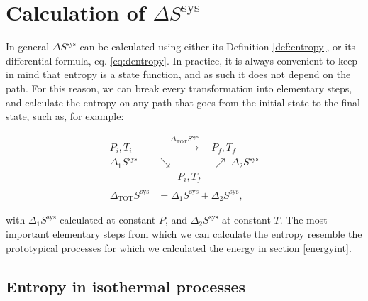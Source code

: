 \documentclass[
  9pt,
]{extbook}
\theoremstyle{definition}
\theoremstyle{definition}
\theoremstyle{definition}
\theoremstyle{definition}
\theoremstyle{remark}
\begin{document}
\section{\texorpdfstring{Calculation of \(\Delta S^{\mathrm{sys}}\)}{Calculation of \textbackslash Delta S\^{}\{\textbackslash mathrm\{sys\}\}}}\label{dssys}

In general \(\Delta S^{\mathrm{sys}}\) can be calculated using either its Definition \ref{def:entropy}, or its differential formula, eq. \eqref{eq:dentropy}. In practice, it is always convenient to keep in mind that entropy is a state function, and as such it does not depend on the path. For this reason, we can break every transformation into elementary steps, and calculate the entropy on any path that goes from the initial state to the final state, such as, for example:

\begin{equation}
\begin{aligned}
P_i, T_i & \quad \xrightarrow{ \Delta_{\text{TOT}} S^{\text{sys}} } \quad P_f, T_f \\
  \scriptstyle{\Delta_1 S^{\text{sys}}} & \searrow \qquad  \qquad \nearrow \; \scriptstyle{\Delta_2 S^{\text{sys}}} \\
& \qquad P_i, T_f \\
\\
\Delta_{\text{TOT}} S^{\text{sys}} & = \Delta_1 S^{\text{sys}} + \Delta_2 S^{\text{sys}},
\end{aligned}
\label{eq:entropycycle}
\end{equation}

with \(\Delta_1 S^{\text{sys}}\) calculated at constant \(P\), and \(\Delta_2 S^{\text{sys}}\) at constant \(T\). The most important elementary steps from which we can calculate the entropy resemble the prototypical processes for which we calculated the energy in section \ref{energyint}.

\subsection{Entropy in isothermal processes}\label{entropy-in-isothermal-processes}
\end{document}
